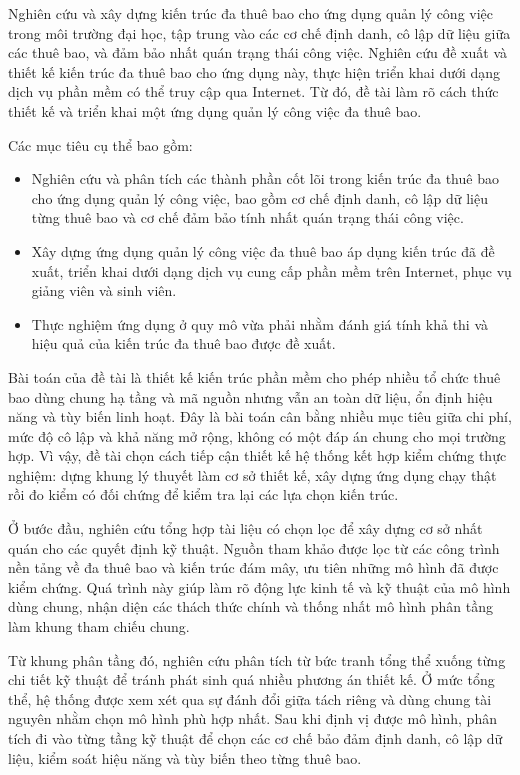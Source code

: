 \label{v4-intro-3}

Nghiên cứu và xây dựng kiến trúc đa thuê bao cho ứng dụng quản lý công việc trong môi trường đại học, tập trung vào các cơ chế định danh, cô lập dữ liệu giữa các thuê bao, và đảm bảo nhất quán trạng thái công việc. Nghiên cứu đề xuất và thiết kế kiến trúc đa thuê bao cho ứng dụng này, thực hiện triển khai dưới dạng dịch vụ phần mềm có thể truy cập qua Internet. Từ đó, đề tài làm rõ cách thức thiết kế và triển khai một ứng dụng quản lý công việc đa thuê bao.

Các mục tiêu cụ thể bao gồm:

\begin{itemize}
\item
  Nghiên cứu và phân tích các thành phần cốt lõi trong kiến trúc đa thuê bao cho ứng dụng quản lý công việc, bao gồm cơ chế định danh, cô lập dữ liệu từng thuê bao và cơ chế đảm bảo tính nhất quán trạng thái công việc.
\item
  Xây dựng ứng dụng quản lý công việc đa thuê bao áp dụng kiến trúc đã đề xuất, triển khai dưới dạng dịch vụ cung cấp phần mềm trên Internet, phục vụ giảng viên và sinh viên.
\item
  Thực nghiệm ứng dụng ở quy mô vừa phải nhằm đánh giá tính khả thi và hiệu quả của kiến trúc đa thuê bao được đề xuất.
\end{itemize}

\label{v4-intro-4}

Bài toán của đề tài là thiết kế kiến trúc phần mềm cho phép nhiều tổ chức thuê bao dùng chung hạ tầng và mã nguồn nhưng vẫn an toàn dữ liệu, ổn định hiệu năng và tùy biến linh hoạt. Đây là bài toán cân bằng nhiều mục tiêu giữa chi phí, mức độ cô lập và khả năng mở rộng, không có một đáp án chung cho mọi trường hợp. Vì vậy, đề tài chọn cách tiếp cận thiết kế hệ thống kết hợp kiểm chứng thực nghiệm: dựng khung lý thuyết làm cơ sở thiết kế, xây dựng ứng dụng chạy thật rồi đo kiểm có đối chứng để kiểm tra lại các lựa chọn kiến trúc.

Ở bước đầu, nghiên cứu tổng hợp tài liệu có chọn lọc để xây dựng cơ sở nhất quán cho các quyết định kỹ thuật. Nguồn tham khảo được lọc từ các công trình nền tảng về đa thuê bao và kiến trúc đám mây, ưu tiên những mô hình đã được kiểm chứng. Quá trình này giúp làm rõ động lực kinh tế và kỹ thuật của mô hình dùng chung, nhận diện các thách thức chính và thống nhất mô hình phân tầng làm khung tham chiếu chung.

Từ khung phân tầng đó, nghiên cứu phân tích từ bức tranh tổng thể xuống từng chi tiết kỹ thuật để tránh phát sinh quá nhiều phương án thiết kế. Ở mức tổng thể, hệ thống được xem xét qua sự đánh đổi giữa tách riêng và dùng chung tài nguyên nhằm chọn mô hình phù hợp nhất. Sau khi định vị được mô hình, phân tích đi vào từng tầng kỹ thuật để chọn các cơ chế bảo đảm định danh, cô lập dữ liệu, kiểm soát hiệu năng và tùy biến theo từng thuê bao.

